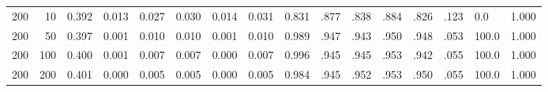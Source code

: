 \begin{table}[ht]
\begin{tabular}{rrllllllllllllll}
  200 & 10 & 0.392 & 0.013 & 0.027 & 0.030 & 0.014 & 0.031 & 0.831 & .877 & .838 & .884 & .826 & .123 & 0.0 & 1.000 \\ 
  200 & 50 & 0.397 & 0.001 & 0.010 & 0.010 & 0.001 & 0.010 & 0.989 & .947 & .943 & .950 & .948 & .053 & 100.0 & 1.000 \\ 
  200 & 100 & 0.400 & 0.001 & 0.007 & 0.007 & 0.000 & 0.007 & 0.996 & .945 & .945 & .953 & .942 & .055 & 100.0 & 1.000 \\ 
  200 & 200 & 0.401 & 0.000 & 0.005 & 0.005 & 0.000 & 0.005 & 0.984 & .945 & .952 & .953 & .950 & .055 & 100.0 & 1.000 \\ 
   \hline
\end{tabular}
\end{table}

